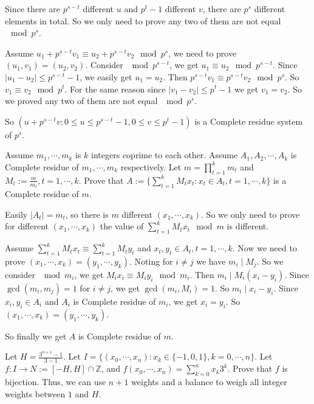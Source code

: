 \documentclass{ctexart}
\begin{document}
\begin{solution}
  Since there are \(p^{s-t}\) different \(u\) and \(p^t-1\) different \(v\), there are \(p^s\) different elements in total.
  So we only need to prove any two of them are not equal \(\mod p^s\).

  Assume \(u_1+p^{s-t}v_1 \equiv u_2 + p^{s-t}v_2 \mod p^s\), we need to prove \((u_1,v_1)=(u_2,v_2)\).
  Consider \(\mod p^{s-t}\), we get \(u_1 \equiv u_2 \mod p^{s-t}\).
  Since \(|u_1-u_2|\leq p^{s-t}-1\), we easily get \(u_1=u_2\).
  Then \(p^{s-t}v_1 \equiv p^{s-t}v_2 \mod p^s\).
  So \(v_1 \equiv v_2 \mod p^t\).
  For the same reason since \(|v_1-v_2|\leq p^t-1\) we get \(v_1=v_2\).
  So we proved any two of them are not equal \(\mod p^s\).

  So \((u+p^{s-t}v:0 \leq u \leq p^{s-t}-1,0 \leq v \leq p^t-1)\) is a Complete residue system of \(p^s\).
\end{solution}
\begin{problem}\label{pro:p40.2}
  Assume \(m_1,\cdots,m_k\) is \(k\) integers coprime to each other.
  Assume \(A_1,A_2,\cdots,A_k\) is Complete residue of \(m_1,\cdots,m_k\) respectively.
  Let \(m=\prod_{t=1}^{k}m_t\) and \(M_t:=\frac{m}{m_t},t=1,\cdots,k\).
  Prove that \(A:=\{\sum_{t=1}^{k}M_t x_t:x_t \in A_t,t=1,\cdots,k\}\) is a Complete residue of \(m\).
\end{problem}
\begin{solution}
  Easily \(|A_t|=m_t\), so there is \(m\) different \((x_1,\cdots,x_k)\).
  So we only need to prove for different \((x_1,\cdots,x_k)\) the value of \(\sum_{t=1}^{k}M_t x_t \mod m\) is different.

  Assume \(\sum_{t=1}^{k}M_t x_t \equiv \sum_{t=1}^{k}M_t y_t\) and \(x_t,y_t \in A_t,t=1,\cdots,k\).
  Now we need to prove \((x_1,\cdots,x_k)=(y_1,\cdots,y_k)\).
  Noting for \(i \neq j\) we have \(m_i \mid M_j\).
  So we consider \(\mod m_i\), we get \(M_ix_i \equiv M_iy_i \mod m_i\).
  Then \(m_i \mid M_i(x_i-y_i)\).
  Since \(\gcd(m_i,m_j)=1\) for \(i \neq j\), we get \(\gcd(m_i,M_i)=1\).
  So \(m_i \mid x_i-y_i\).
  Since \(x_i,y_i \in A_i\) and \(A_i\) is Complete residue of \(m_i\), we get \(x_i=y_i\).
  So \((x_1,\cdots,x_k)=(y_1,\cdots,y_k)\).

  So finally we get \(A\) is Complete residue of \(m\).
\end{solution}
\begin{problem}\label{pro:p40.3}
  Let \(H=\frac{3^{n+1}-1}{3-1}\). Let \(I=\{(x_0,\cdots,x_n):x_k \in \{-1,0,1\},k=0,\cdots,n\}\).
  Let \(f:I \to N:=[-H,H]\cap \mathbb{Z}\), and \(f(x_0,\cdots,x_n)=\sum_{k=0}^{n}x_k 3^k\).
  Prove that \(f\) is bijection.
  Thus, we can use \(n+1\) weights and a balance to weigh all integer weights between \(1\) and \(H\).
\end{problem}
\end{document}
